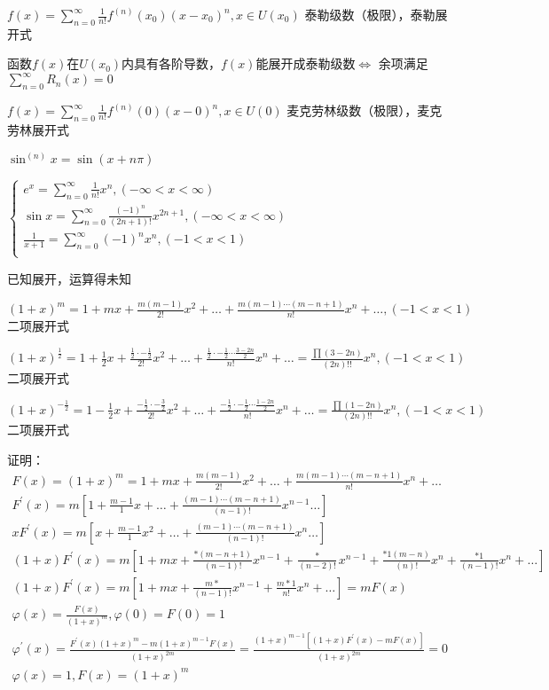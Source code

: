 \documentclass[UTF8]{ctexart}
\newcommand{\mda}[1]{$\displaystyle{ #1 }$}
\newcommand{\mf}[1]{\left( #1\right)}
\newcommand{\mfc}[1]{\left[ #1 \right]}
\newcommand{\ma}[1]{\begin{array}{llll} #1 \end{array}}
\newcommand{\fcz}[1] {
    \left\{
        \begin{array}{llll} #1 \end{array}
    \right.
}
\newcommand{\jisu}[1]{\sum_{n=0}^\infty #1}
\begin{document}
$f\mf{x}=\jisu{\frac{1}{n!}f^{\mf{n}}\mf{x_0}\mf{x-x_0}^n},x \in U\mf{x_0}$ 泰勒级数（极限），泰勒展开式


函数$f\mf{x}$在$U\mf{x_0}$内具有各阶导数，$f\mf{x}$能展开成泰勒级数$\Leftrightarrow$ 余项满足$\jisu{R_n\mf{x}}=0$

$f\mf{x}=\jisu{\frac{1}{n!}f^{\mf{n}}\mf{0}\mf{x-0}^n},x \in U\mf{0}$ 麦克劳林级数（极限），麦克劳林展开式

$\sin^{\mf{n}}x=\sin \mf{x+n\pi}$

\mda{\fcz{
    e^x=\jisu{\frac{1}{n!}x^n},\mf{-\infty<x< \infty}\\
    \sin x=\jisu{\frac{\mf{-1}^n}{\mf{2n+1}!} x^{2n+1}},\mf{-\infty<x< \infty} \\
    \frac{1}{x+1}=\jisu{\mf{-1}^nx^n} ,\mf{-1<x<1}\\
}}

已知展开，运算得未知


$\mf{1+x}^m=1+mx+\frac{m\mf{m-1}}{2!}x^2+\dots+\frac{m\mf{m-1} \cdots \mf{m-n+1}}{n!}x^n+\dots,\mf{-1<x<1}$二项展开式

$\mf{1+x}^\frac{1}{2}=1+\frac{1}{2}x+\frac{\frac{1}{2}\cdot -\frac{1}{2}}{2!}x^2+\dots+\frac{\frac{1}{2}\cdot -\frac{1}{2} \cdots \frac{3-2n}{2}}{n!}x^n+\dots=\frac{\prod \mf{3-2n}}{\mf{2n}!!}x^n,\mf{-1<x<1}$二项展开式

$\mf{1+x}^{-\frac{1}{2}}=1-\frac{1}{2}x+\frac{-\frac{1}{2}\cdot -\frac{3}{2}}{2!}x^2+\dots+\frac{-\frac{1}{2}\cdot -\frac{1}{2} \cdots \frac{1-2n}{2}}{n!}x^n+\dots=\frac{\prod \mf{1-2n}}{\mf{2n}!!}x^n,\mf{-1<x<1}$二项展开式
 

证明：$\ma{F\mf{x}=\mf{1+x}^m
=1+mx+\frac{m\mf{m-1}}{2!}x^2+\dots+\frac{m\mf{m-1} \cdots \mf{m-n+1}}{n!}x^n+\dots\\
F^{'}\mf{x}=m\mfc{1+\frac{m-1}{1}x+\dots+\frac{\mf{m-1} \cdots \mf{m-n+1}}{\mf{n-1}!}x^{n-1}\dots}\\
xF^{'}\mf{x}=m\mfc{x+\frac{m-1}{1}x^2+\dots+\frac{\mf{m-1} \cdots \mf{m-n+1}}{\mf{n-1}!}x^n\dots}\\
\mf{1+x}F^{'}\mf{x}=m\mfc{1+mx+\frac{*\mf{m-n+1}}{\mf{n-1}!}x^{n-1}+\frac{*}{\mf{n-2}!}x^{n-1}+\frac{*1\mf{m-n}}{\mf{n}!}x^{n}+\frac{*1}{\mf{n-1}!}x^{n}+\dots}\\
\mf{1+x}F^{'}\mf{x}=m\mfc{1+mx+ \frac{m*}{\mf{n-1}!}x^{n-1}+\frac{m*1}{n!}x^n+\dots}=mF\mf{x}\\
\varphi\mf{x}=\frac{F\mf{x}}{\mf{1+x}^m},\varphi\mf{0}=F\mf{0}=1\\
\varphi^{'}\mf{x}=\frac{F^{'}\mf{x}\mf{1+x}^m-m\mf{1+x}^{m-1}F\mf{x}}{\mf{1+x}^{2m}}=\frac{\mf{1+x}^{m-1}\mfc{\mf{1+x}F^{'}\mf{x}-mF\mf{x}}}{\mf{1+x}^{2m}}=0\\
\varphi\mf{x}=1,F\mf{x}=\mf{1+x}^m
}$
\end{document}
